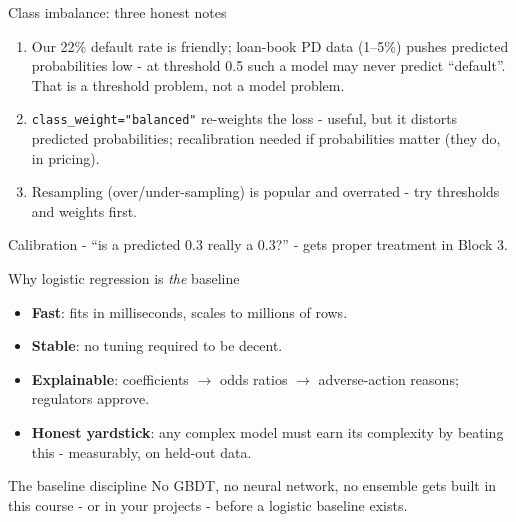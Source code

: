\documentclass[10pt,aspectratio=169]{beamer}
\begin{document}
\begin{frame}{Class imbalance: three honest notes}
  \begin{enumerate}
    \item Our 22\% default rate is friendly; loan-book PD data (1--5\%) pushes
          predicted probabilities low - at threshold 0.5 such a model may
          \alert{never} predict ``default''. That is a threshold problem,
          not a model problem.
    \item \texttt{class\_weight="balanced"} re-weights the loss - useful,
          but it \alert{distorts predicted probabilities}; recalibration
          needed if probabilities matter (they do, in pricing).
    \item Resampling (over/under-sampling) is popular and overrated -
          try thresholds and weights first.
  \end{enumerate}
  \vspace{0.4em}
  \begin{center}\small
    Calibration - ``is a predicted 0.3 really a 0.3?'' - gets proper
    treatment in Block 3.
  \end{center}
\end{frame}

\begin{frame}{Why logistic regression is \emph{the} baseline}
  \begin{itemize}
    \item \textbf{Fast}: fits in milliseconds, scales to millions of rows.
    \item \textbf{Stable}: no tuning required to be decent.
    \item \textbf{Explainable}: coefficients $\to$ odds ratios $\to$
          adverse-action reasons; regulators approve.
    \item \textbf{Honest yardstick}: any complex model must \alert{earn its
          complexity} by beating this - measurably, on held-out data.
  \end{itemize}
  \vspace{0.6em}
  \begin{block}{The baseline discipline}
    No GBDT, no neural network, no ensemble gets built in this course -
    or in your projects - before a logistic baseline exists.
  \end{block}
\end{frame}
\end{document}
